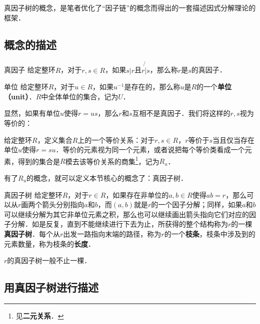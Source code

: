 

真因子树的概念，是笔者优化了“因子链”的概念而得出的一套描述因式分解理论的框架．

\subsection{概念的描述}

\begin{definition}{真因子}
给定整环$R$，对于$r, s\in R$，如果$s|r$且$r\not{|}s$，那么称$r$是$s$的真因子．
\end{definition}

\begin{definition}{单位}
给定整环$R$，对于$u\in R$，如果$u^{-1}$是存在的，那么称$u$是$R$的一个\textbf{单位（unit）}．$R$中全体单位的集合，记为$U$．
\end{definition}

显然，如果有单位$u$使得$r=us$，那么$r$和$s$互相不是真因子．我们将这样的$r, s$视为等价的：

\begin{definition}{}
给定整环$R$，定义集合$R$上的一个等价关系：对于$r, s\in R$，$r$等价于$s$当且仅当存在单位$u$使得$r=su$．等价的元素视为同一个元素，或者说把每个等价类看成一个元素，得到的集合是$R$模去该等价关系的商集\footnote{见\textbf{二元关系}．}，记为$R_u$．
\end{definition}

有了$R_u$的概念，就可以定义本节核心的概念了：真因子树．

\begin{definition}{真因子树}
给定整环$R$，对于$r\in R$，如果存在非单位的$a, b\in R$使得$ab=r$，那么可以从$r$画两个箭头分别指向$a$和$b$，而$(a, b)$就是$r$的一个因子分解；同样，如果$a$和$b$可以继续分解为其它非单位元素之积，那么也可以继续画出箭头指向它们对应的因子分解．如是反复，直到不能继续进行下去为止，所获得的整个结构称为$r$的一棵\textbf{真因子树}．每个从$r$出发一路指向末端的路径，称为$r$的一个\textbf{枝条}，枝条中涉及到的元素数量，称为枝条的\textbf{长度}．

$r$的真因子树一般不止一棵．
\end{definition}



\subsection{用真因子树进行描述}

